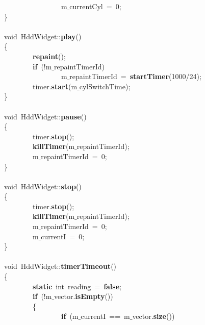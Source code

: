 \mbox{}\ \ \ \ \ \ \ \ \ \ \ \ \ \ \ \ m$\_$currentCyl\ =\ 0; \\
\mbox{}\} \\
\mbox{} \\
\mbox{}void\ HddWidget::\textbf{play}() \\
\mbox{}\{ \\
\mbox{}\ \ \ \ \ \ \ \ \textbf{repaint}(); \\
\mbox{}\ \ \ \ \ \ \ \ \textbf{if}\ (!m$\_$repaintTimerId) \\
\mbox{}\ \ \ \ \ \ \ \ \ \ \ \ \ \ \ \ m$\_$repaintTimerId\ =\ \textbf{startTimer}(1000/24); \\
\mbox{}\ \ \ \ \ \ \ \ timer.\textbf{start}(m$\_$cylSwitchTime); \\
\mbox{}\} \\
\mbox{} \\
\mbox{}void\ HddWidget::\textbf{pause}() \\
\mbox{}\{ \\
\mbox{}\ \ \ \ \ \ \ \ timer.\textbf{stop}(); \\
\mbox{}\ \ \ \ \ \ \ \ \textbf{killTimer}(m$\_$repaintTimerId); \\
\mbox{}\ \ \ \ \ \ \ \ m$\_$repaintTimerId\ =\ 0; \\
\mbox{}\} \\
\mbox{} \\
\mbox{}void\ HddWidget::\textbf{stop}() \\
\mbox{}\{ \\
\mbox{}\ \ \ \ \ \ \ \ timer.\textbf{stop}(); \\
\mbox{}\ \ \ \ \ \ \ \ \textbf{killTimer}(m$\_$repaintTimerId); \\
\mbox{}\ \ \ \ \ \ \ \ m$\_$repaintTimerId\ =\ 0; \\
\mbox{}\ \ \ \ \ \ \ \ m$\_$currentI\ =\ 0; \\
\mbox{}\} \\
\mbox{} \\
\mbox{}void\ HddWidget::\textbf{timerTimeout}() \\
\mbox{}\{ \\
\mbox{}\ \ \ \ \ \ \ \ \textbf{static}\ int\ reading\ =\ \textbf{false}; \\
\mbox{}\ \ \ \ \ \ \ \ \textbf{if}\ (!m$\_$vector.\textbf{isEmpty}()) \\
\mbox{}\ \ \ \ \ \ \ \ \{ \\
\mbox{}\ \ \ \ \ \ \ \ \ \ \ \ \ \ \ \ \textbf{if}\ (m$\_$currentI\ ==\ m$\_$vector.\textbf{size}()) \\
